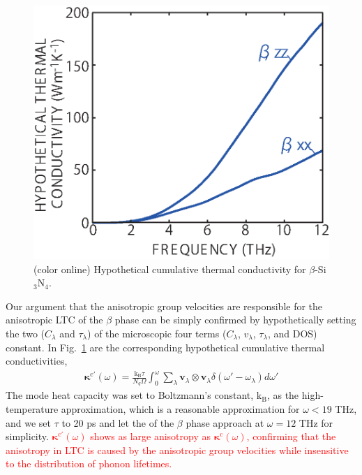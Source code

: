 \documentclass[twocolumn,amsmath,amssymb,a4paper,prb,superscriptaddress,floatfix]{revtex4-1}
\begin{document}
\begin{figure}[ht]
 \begin{center}
  \includegraphics[width=0.80\linewidth]{Fig6_338_beta.eps}
  \caption{(color online) Hypothetical cumulative thermal conductivity
  for $\beta$-Si$_3$N$_4$. \label{fig:Fig6_338_beta} }
 \end{center}
\end{figure}

Our argument that the anisotropic group velocities are responsible for
the anisotropic LTC of the $\beta$ phase can be simply confirmed by
hypothetically setting the two ($C_\lambda$ and $\tau_\lambda$) of the
microscopic four terms ($C_\lambda$, $v_\lambda$, $\tau_\lambda$, and
DOS) constant. In Fig.~\ref{fig:Fig6_338_beta} are the corresponding
hypothetical cumulative thermal conductivities,
\begin{align}
 \boldsymbol{\kappa}^{\text{c}'}(\omega) =
 \frac{\mathrm{k_B}\tau}{N_q\Omega} \int^\omega_0 \sum_\lambda
 \mathbf{v}_\lambda
 \otimes \mathbf{v}_\lambda \delta(\omega' - \omega_\lambda)d\omega'
\end{align}
The mode heat capacity was set to Boltzmann’s constant, $\mathrm{k_B}$,
as the high-temperature approximation, which is a reasonable
approximation for $\omega < 19$ THz, and we set $\tau$ to 20 ps and let
the of the $\beta$ phase approach at $\omega=12$ THz for simplicity.
%
\textcolor{red}{$\boldsymbol{\kappa}^{\text{c}'}(\omega)$ shows as large
anisotropy as $\boldsymbol{\kappa}^{\text{c}}(\omega)$, confirming that the anisotropy in LTC is caused by the
anisotropic group velocities while insensitive to the distribution of
phonon lifetimes.}
\end{document}
